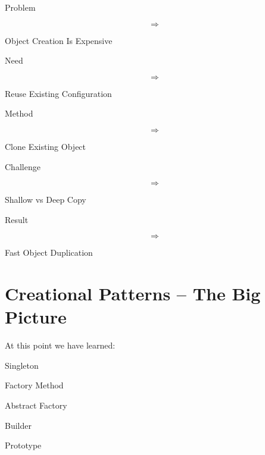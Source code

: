 \documentclass[11pt,a4paper]{book}
\begin{document}
\begin{compressionbox}

Problem

\[
\Rightarrow
\]

Object Creation Is Expensive

\vspace{0.5em}

Need

\[
\Rightarrow
\]

Reuse Existing Configuration

\vspace{0.5em}

Method

\[
\Rightarrow
\]

Clone Existing Object

\vspace{0.5em}

Challenge

\[
\Rightarrow
\]

Shallow vs Deep Copy

\vspace{0.5em}

Result

\[
\Rightarrow
\]

Fast Object Duplication

\end{compressionbox}
\section{Creational Patterns -- The Big Picture}

At this point we have learned:


Singleton


Factory Method


Abstract Factory


Builder


Prototype
\end{document}
